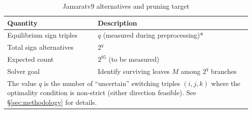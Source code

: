 \begin{table}[h!]
\caption{Jamaratv9 alternatives and pruning target}
\label{tab:jamaratv9-alternatives}
\centering
\begin{tabular}{lp{4cm}}
\toprule
\textbf{Quantity} & \textbf{Description} \\
\midrule
Equilibrium sign triples & $q$ (measured during preprocessing)* \\
Total sign alternatives & $2^q$ \\
Expected count & $2^{95}$ (to be measured) \\
Solver goal & Identify surviving leaves $M$ among $2^q$ branches \\
\bottomrule
\multicolumn{2}{p{11cm}}{\footnotesize *The value $q$ is the number of ``uncertain'' switching triples $(i,j,k)$ where the optimality condition is non-strict (either direction feasible). See \S\ref{sec:methodology} for details.} \\
\end{tabular}
\end{table}

